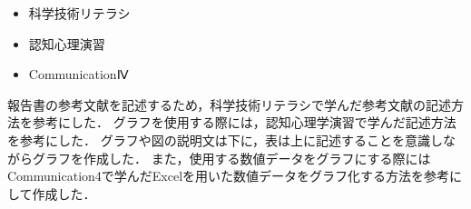 \documentclass[../report]{subfiles}
\begin{document}
\begin{itemize}
    \item 科学技術リテラシ
    \item 認知心理演習
    \item CommunicationⅣ
\end{itemize}
報告書の参考文献を記述するため，科学技術リテラシで学んだ参考文献の記述方法を参考にした．
グラフを使用する際には，認知心理学演習で学んだ記述方法を参考にした．
グラフや図の説明文は下に，表は上に記述することを意識しながらグラフを作成した．
また，使用する数値データをグラフにする際にはCommunication4で学んだExcelを用いた数値データをグラフ化する方法を参考にして作成した．
\end{document}
